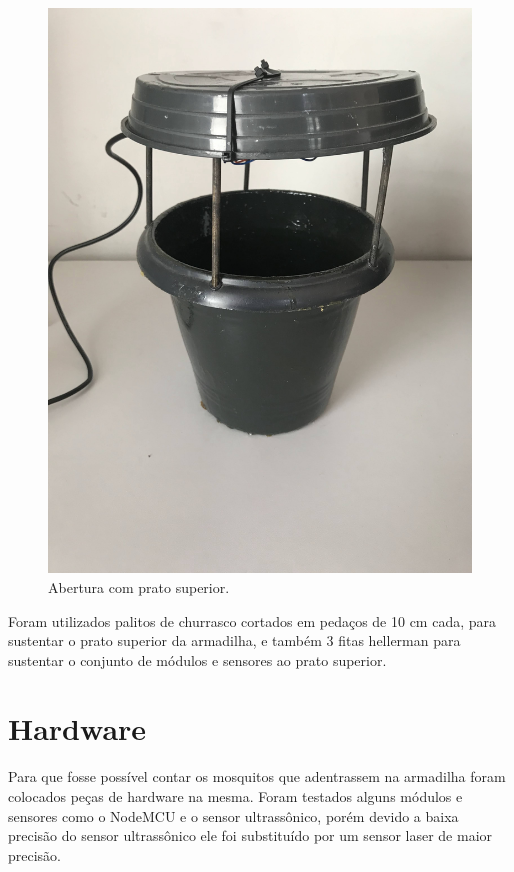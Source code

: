 \documentclass[
	12pt,				%
	openright,			%
	oneside,			%
	a4paper,			%
	chapter=TITLE,		%
	english,			%
	brazil				%
	]{abntex2}
\begin{document}
\begin{figure}[H]
    \centering
    \includegraphics[scale=0.04, angle=-90]{imagens/IMG_0604.jpg}
    \caption{Abertura com prato superior.}
    \label{fig:abertura}
\end{figure}   

Foram utilizados palitos de churrasco cortados em pedaços de 10 cm cada, para sustentar o prato superior da armadilha, e também 3 
fitas hellerman para sustentar
o conjunto de módulos e sensores ao prato superior. 


\section{Hardware}

Para que fosse possível contar os mosquitos que adentrassem na armadilha foram colocados peças de hardware na mesma.
Foram testados alguns módulos e sensores como o NodeMCU e o sensor ultrassônico, porém devido a baixa precisão do sensor ultrassônico ele 
foi substituído por um sensor laser de maior precisão.
\end{document}
